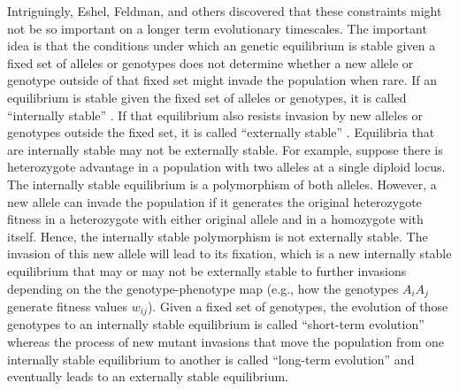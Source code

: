 \documentclass[11pt]{article}
\begin{document}
Intriguingly, Eshel, Feldman, and others discovered that these constraints might not be so important on a longer term evolutionary timescales. The important idea is that the conditions under which an genetic equilibrium is stable given a fixed set of alleles or genotypes does not determine whether a new allele or genotype outside of that fixed set might invade the population when rare. If an equilibrium is stable given the fixed set of alleles or genotypes, it is called ``internally stable'' \cite{Eshel:1996}. If that equilibrium also resists invasion by new alleles or genotypes outside the fixed set, it is called ``externally stable'' \cite{Liberman:1988,Eshel:1996}. Equilibria that are internally stable may not be externally stable. For example, suppose there is heterozygote advantage in a population with two alleles at a single diploid locus. The internally stable equilibrium is a polymorphism of both alleles. However, a new allele can invade the population if it generates the original heterozygote fitness in a heterozygote with either original allele and in a homozygote with itself. Hence, the internally stable polymorphism is not externally stable. The invasion of this new allele will lead to its fixation, which is a new internally stable equilibrium that may or may not be externally stable to further invasions depending on the the genotype-phenotype map (e.g., how the genotypes $A_{i} A_{j}$ generate fitness values $w_{ij}$). Given a fixed set of genotypes, the evolution of those genotypes to an internally stable equilibrium is called ``short-term evolution'' whereas the process of new mutant invasions that move the population from one internally stable equilibrium to another is called ``long-term evolution'' \cite{Eshel:1991,Eshel:1996,Hammerstein:1996,Weissing:1996,Eshel:Feldman:1998,VanCleve:2015,VanCleve:2020} and eventually leads to an externally stable equilibrium.
\end{document}
